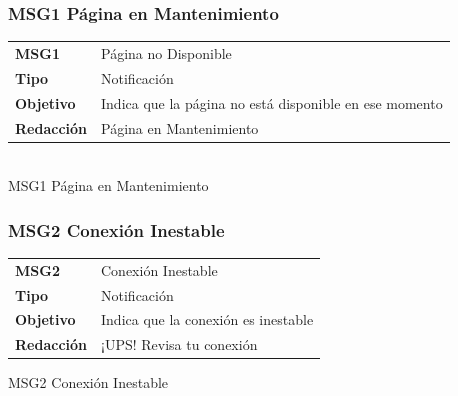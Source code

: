 \documentclass[14pt]{article}
\begin{document}
            \subsubsection{MSG1 Página en Mantenimiento}\label{MSG1 Página en Mantenimiento}
                \begin{table}[H]
                    \begin{center}
                        \begin{tabular}{| l | l | } \hline
                        \textbf{MSG1} & Página no Disponible  \\
                        \textbf{Tipo} & Notificación \\
                        \textbf{Objetivo} & Indica que la página no está disponible en ese momento \\
                        \textbf{Redacción} & Página en Mantenimiento \\ \hline
                        \end{tabular}\\
                        
                        \vspace{0.3cm} MSG1 Página en Mantenimiento
                    \end{center}
                \end{table}
                    
            \subsubsection{MSG2 Conexión Inestable}\label{MSG2 Conexión Inestable}
                \begin{table}[H]
                    \begin{center}
                        \begin{tabular}{| l | l | } \hline
                        \textbf{MSG2} & Conexión Inestable  \\
                        \textbf{Tipo} & Notificación \\
                        \textbf{Objetivo} & Indica que la conexión es inestable \\
                        \textbf{Redacción} & ¡UPS! Revisa tu conexión \\ \hline
                        \end{tabular}
                        
                        \vspace{0.3cm} MSG2 Conexión Inestable
                    \end{center}
                \end{table}
                
\end{document}
